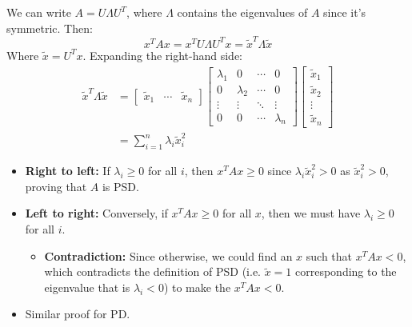 \begin{derivation}
    We can write \( A = U \Lambda U^T \), where \( \Lambda \) contains the eigenvalues of \( A \) since it's symmetric. Then:
\[
x^T A x = x^T U \Lambda U^T x = \tilde{x}^T \Lambda \tilde{x}
\]
Where \( \tilde{x} = U^T x \). Expanding the right-hand side:
\begin{align*}
    \tilde{x}^T \Lambda \tilde{x} &= 
    \begin{bmatrix}
    \tilde{x}_1 & \cdots & \tilde{x}_n
    \end{bmatrix}
    \begin{bmatrix}
    \lambda_1 & 0 & \cdots & 0 \\
    0 & \lambda_2 & \cdots & 0 \\
    \vdots & \vdots & \ddots & \vdots \\
    0 & 0 & \cdots & \lambda_n
    \end{bmatrix}
    \begin{bmatrix}
    \tilde{x}_1 \\
    \tilde{x}_2 \\
    \vdots \\
    \tilde{x}_n
    \end{bmatrix} \\
    &= \sum_{i=1}^{n} \lambda_i \tilde{x}_i^2
    \end{align*}
\begin{itemize}
    \item \textbf{Right to left:} If \( \lambda_i \geq 0 \) for all \( i \), then \( x^T A x \geq 0 \) since $\lambda_i \tilde{x}_i^2 > 0$ as $ \tilde{x}_i^2>0$, proving that \( A \) is PSD.
    \item \textbf{Left to right:} Conversely, if \( x^T A x \geq 0 \) for all \( x \), then we must have \( \lambda_i \geq 0 \) for all \( i \).
    \begin{itemize}
        \item \textbf{Contradiction:} Since otherwise, we could find an \( x \) such that \( x^T A x < 0 \), which contradicts the definition of PSD (i.e. $\tilde{x} = 1$ corresponding to the eigenvalue that is $\lambda_i < 0$) to make the $x^T A x <0$.
    \end{itemize}
    \item Similar proof for PD.
\end{itemize}
\end{derivation}

